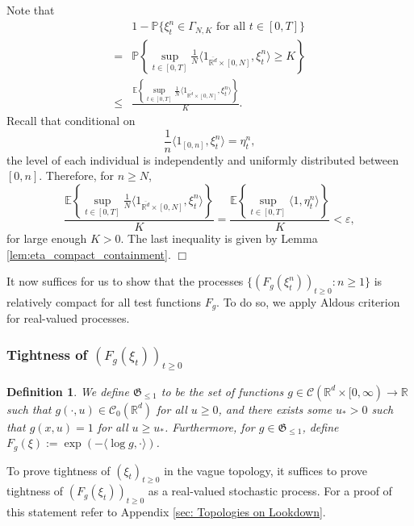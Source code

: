 \documentclass[12pt]{article}
\newenvironment {proof}{{\noindent\bf Proof }}{\hfill $\Box$ \medskip}
\newtheorem{definition}[theorem]{Definition}
\newcommand{\IR}{\mathbb R}
\begin{document}
\begin{proof}
Note that
\begin{equation}
\begin{aligned}
     &1-\mathbb{P}\{ \xi^n_t \in \Gamma_{N,K} \text{ for all } t\in [0,T]\} \\
     = & \mathbb{P}\left\{ \sup_{t \in[0,T]}\frac{1}{N}\langle 1_{\overline{\mathbb{R}^d}\times [0,N]}, \xi^n_t \rangle \geq K \right\} \\
 \leq & \frac{\mathbb{E}\left\{ \sup_{t \in[0,T]}\frac{1}{N}\langle 1_{\overline{\mathbb{R}^d}\times [0,N]}, \xi^n_t \rangle\right\}}{K}.
\end{aligned}
\end{equation}
Recall that conditional on 
$$ \frac{1}{n}\langle 1_{[0,n]}, \xi^n_t \rangle = \eta^n_t,$$
the level of each individual is independently and uniformly distributed between $[0,n]$.
Therefore, for $n \geq N$,
\begin{equation}
\frac{\mathbb{E}\left\{ \sup_{t \in[0,T]}\frac{1}{N}\langle 1_{\overline{\mathbb{R}^d}\times [0,N]}, \xi^n_t \rangle\right\}}{K}
= \frac{\mathbb{E}\left\{ \sup_{t\in [0,T]}\langle 1, \eta^n_t \rangle \right\}}{K} < \varepsilon,
\end{equation}
for large enough $K>0$. 
The last inequality is given by Lemma \ref{lem:eta_compact_containment}.
\end{proof}

It now suffices for us to show that the processes $\{(F_g(\xi^n_t))_{t \geq 0}: n \geq 1\}$ is relatively compact for all test functions $F_g$.
To do so, we apply Aldous criterion for real-valued processes.

\subsubsection{Tightness of $(F_g(\xi_t))_{t \geq 0}$}

\begin{definition}
We define $\mathfrak{G}_{\leq 1}$ to be the set of functions $g \in \mathcal{C}(\IR^d \times [0, \infty) \to \IR$ such that 
$g(\cdot, u) \in \mathcal{C}_{0}(\IR^d)$ for all $u \geq 0$, and there exists some $u_{*}>0$ such that $g(x,u)=1$ for all $u \geq u_{*}$. Furthermore, for $g \in \mathfrak{G}_{\leq 1}$, define $F_g(\xi):= \exp(-\langle \log g, \cdot \rangle )$.
\end{definition}

To prove tightness of $(\xi_t)_{t \geq 0}$ in the vague topology, it suffices to prove tightness of $(F_g(\xi_t))_{t \geq 0}$ as a real-valued stochastic process. For a proof of this statement refer to Appendix \ref{sec: Topologies on Lookdown}.
\end{document}
